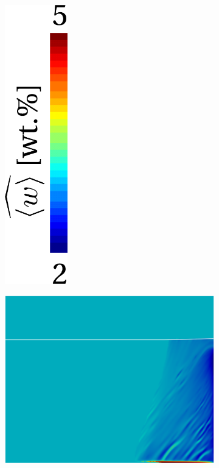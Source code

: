 \begin{figure}[htbp]
\begin{subfigure}[t]{0.15\textwidth}
  \includegraphics[width=0.3\textwidth]{Chapter5/Graphics/2d/colorbar_w.pdf}
  \end{subfigure}
  \begin{subfigure}[t]{0.4\textwidth}
    \centering
  \includegraphics[width=\textwidth]{Chapter5/Graphics/2d/processed/1200s_compobis.png}

\end{subfigure}
\end{figure}
